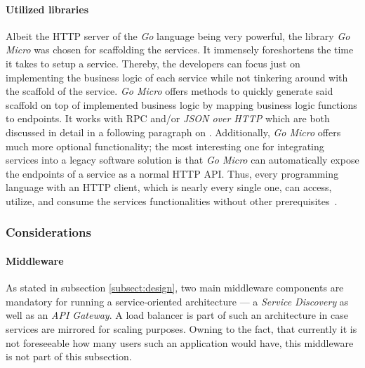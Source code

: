 \documentclass[12pt,a4paper,twoside]{report}
\begin{document}
\paragraph{Utilized libraries}
Albeit the HTTP server of the \textit{Go} language being very powerful,
the library \textit{Go Micro} was chosen for scaffolding the services.
It immensely foreshortens the time it takes to setup a service.
Thereby, the developers can focus just on implementing the business logic
of each service while not tinkering around with the scaffold of the service.
\textit{Go Micro} offers methods to quickly generate said scaffold on top
of implemented business logic by mapping business logic functions to endpoints.
It works with RPC and/or \textit{JSON over HTTP} which are both discussed
in detail in a following paragraph on \textit{}.
Additionally, \textit{Go Micro} offers much more optional functionality;
the most interesting one for integrating services into a legacy software solution
is that \textit{Go Micro} can automatically expose the endpoints of a service
as a normal HTTP API. Thus, every programming language with an HTTP client,
which is nearly every single one, can access, utilize, and consume the services
functionalities without other prerequisites~\cite{go-micro}.


\subsubsection{Considerations}

\paragraph{Middleware}
As stated in subsection \ref{subsect:design}, two main middleware components
are mandatory for running a service-oriented architecture ---
a \textit{Service Discovery} as well as an \textit{API Gateway}.
A load balancer is part of such an architecture in case services are mirrored
for scaling purposes. Owning to the fact, that currently it is not foreseeable
how many users such an application would have, this middleware is not part of
this subsection.
\end{document}
